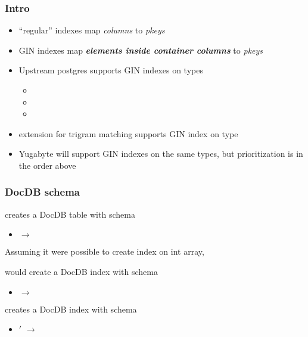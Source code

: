 \begin{frame}
  \titlepage
  \hypertarget{titlePage}{}
\end{frame}

\begin{frame}
  \frametitle{Intro}
  \begin{itemize}
    \item ``regular'' indexes map \emph{columns} to \emph{pkeys}
      \pause
    \item GIN indexes map \textbf{\emph{elements inside container columns}} to
      \emph{pkeys}
      \pause
    \item Upstream postgres supports GIN indexes on types
      \begin{itemize}
        \item {}
        \item {}
        \item {}
      \end{itemize}
      \pause
    \item {} extension for trigram matching supports GIN
      index on type 
      \pause
    \item Yugabyte will support GIN indexes on the same types, but
      prioritization is in the order above
  \end{itemize}
\end{frame}

\begin{frame}
  \frametitle{DocDB schema}

  creates a DocDB table with schema
  \begin{itemize}
    \item {} $\rightarrow$ 
  \end{itemize}
  \pause

  Assuming it were possible to create index on int array,


  would create a DocDB index with schema
  \begin{itemize}
    \item {} $\rightarrow$ 
  \end{itemize}
  \pause


  creates a DocDB index with schema
  \begin{itemize}
    \item {}$'$ $\rightarrow$ 
  \end{itemize}

\end{frame}

